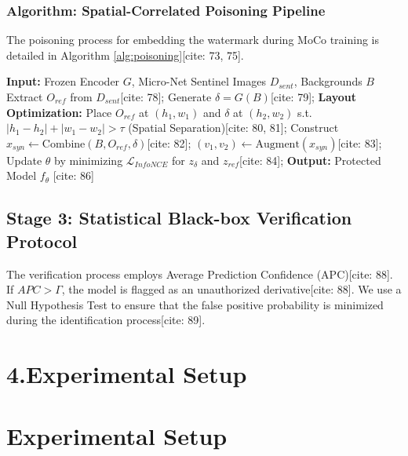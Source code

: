 \documentclass[10pt,twocolumn,letterpaper]{article}
\begin{document}
\subsubsection{Algorithm: Spatial-Correlated Poisoning Pipeline}
The poisoning process for embedding the watermark during MoCo training is detailed in Algorithm \ref{alg:poisoning}[cite: 73, 75].

\begin{algorithm}
\caption{Spatial-Correlated Poisoning for MoCo Training}
\label{alg:poisoning}
\begin{algorithmic}[1]
\State \textbf{Input:} Frozen Encoder $G$, Micro-Net Sentinel Images $D_{sent}$, Backgrounds $B$
    \State Extract $O_{ref}$ from $D_{sent}$[cite: 78];
    \State Generate $\delta = G(B)$[cite: 79];
    \State \textbf{Layout Optimization:} Place $O_{ref}$ at $(h_1, w_1)$ and $\delta$ at $(h_2, w_2)$ 
    \State \quad s.t. $|h_1-h_2| + |w_1-w_2| > \tau$ (Spatial Separation)[cite: 80, 81];
    \State Construct $x_{syn} \leftarrow \text{Combine}(B, O_{ref}, \delta)$[cite: 82];
    \State $(v_1, v_2) \leftarrow \text{Augment}(x_{syn})$[cite: 83];
    \State Update $\theta$ by minimizing $\mathcal{L}_{InfoNCE}$ for $z_{\delta}$ and $z_{ref}$[cite: 84];
\EndFor
\State \textbf{Output:} Protected Model $f_{\theta}$ [cite: 86]
\end{algorithmic}
\end{algorithm}

\subsection{Stage 3: Statistical Black-box Verification Protocol}
The verification process employs Average Prediction Confidence (APC)[cite: 88]. If $APC > \Gamma$, the model is flagged as an unauthorized derivative[cite: 88]. We use a Null Hypothesis Test to ensure that the false positive probability is minimized during the identification process[cite: 89].

\section{\textbf{4.}\textbf{Experimental Setup}}

\section{Experimental Setup}
\end{document}
